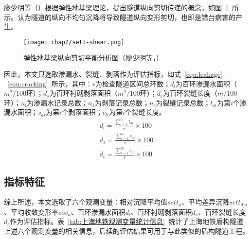 廖少明等（\citeyear{廖少明2005隧道纵向剪切传递效应及其一维解析}）根据弹性地基梁理论，提出隧道纵向剪切传递的概念，如图~\ref{fig:弹性地基梁纵向剪切平衡分析图}~所示。认为隧道的纵向不均匀沉降将导致隧道纵向变形剪切，也即是错台病害的产生。

\begin{figure}[htbp]
    \centering
    \texttt{[image: chap2/sett-shear.png]}
    \caption{弹性地基梁纵向剪切平衡分析图（廖少明等，\citeyear{廖少明2005隧道纵向剪切传递效应及其一维解析}）}
    \label{fig:弹性地基梁纵向剪切平衡分析图}
\end{figure}

因此，本文只选取渗漏水、裂缝、剥落作为评估指标，如式~\ref{equ:leakage}~-~\ref{equ:cracking}~所示，其中：$r$为检查隧道区间总环数；${d}_{l}$为百环渗漏水面积（$m^2/100$环）；${d}_{s}$为百环衬砌剥落面积（$m^2/100$环）；${d}_{c}$为百环裂缝长度（$m/100$环）；${n}_{l}$为渗漏水记录总数；${n}_{s}$为剥落记录总数；${n}_{c}$为裂缝记录总数；${l}_{ai}$为第$i$个渗漏水面积；${s}_{ai}$为第$i$个剥落面积；${c}_{li}$为第$i$个裂缝长度。
\begin{align}
    \label{equ:leakage}
    {{d}_{l}}=\frac{\sum\limits_{i=1}^{{{n}_{l}}}{{{l}_{ai}}}}{r}\times 100 \\
    \label{equ:spalling}
    {{d}_{s}}=\frac{\sum\limits_{i=1}^{{{n}_{s}}}{{{s}_{ai}}}}{r}\times 100 \\
    \label{equ:cracking}
    {{d}_{c}}=\frac{\sum\limits_{i=1}^{{{n}_{c}}}{{{c}_{li}}}}{r}\times 100
\end{align}
\subsection{指标特征}

综上所述，本文选取了六个观测变量：相对沉降平均值${sett}_{a}$、平均差异沉降$set{{t}_{d\_a}}$、平均收敛变形率${cov}_{a}$、百环渗漏水面积${d}_{l}$、百环衬砌剥落面积${d}_{s}$、百环裂缝长度${d}_{c}$作为评估指标。表~\ref{tab:上海地铁观测变量统计信息}~统计了上海地铁盾构隧道上述六个观测变量的相关信息，后续的评估结果可用于与此类似的盾构隧道工程。

